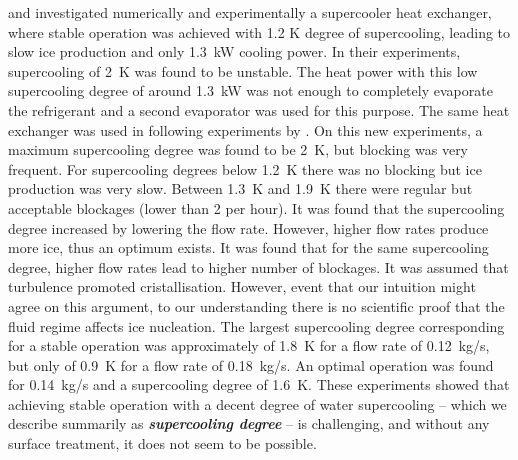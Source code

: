 \cite{castaing-lasvignottes_dynamic_2006} and \cite{bedecarrats_ice_2010} investigated numerically and experimentally a supercooler heat exchanger, where stable operation was achieved with 1.2 K degree of supercooling, leading to slow ice production and only 1.3~kW cooling power.
In their experiments, supercooling of 2~K was found to be unstable. The heat power with this low supercooling degree of around 1.3~kW was not enough to completely evaporate the refrigerant and a second evaporator was used for this purpose. %
The same heat exchanger was used in following experiments by \cite{bedecarrats_ice_2010}. On this new experiments, a maximum supercooling degree was found to be 2~K, but blocking was very frequent. For supercooling degrees below 1.2~K there was no blocking but ice production was very slow. Between 1.3~K and 1.9~K there were regular  but acceptable blockages (lower than 2 per hour).
It was found that the supercooling degree increased by lowering the flow rate. However, higher flow rates produce more ice, thus an optimum exists.
It was found that for the same supercooling degree, higher flow rates lead to higher number of blockages. It was assumed that turbulence promoted cristallisation. However, event that our intuition might agree on this argument, to our understanding there is no scientific proof that the fluid regime affects ice nucleation. 
The largest supercooling degree corresponding for a stable operation was approximately of \SI{1.8}{K} for a flow rate of \SI{0.12}{kg/s}, but only of 0.9~K for a flow rate of 0.18~kg/s. 
An optimal operation was found for 0.14~kg/s and a supercooling degree of 1.6~K. 
These experiments showed that achieving stable operation with a decent degree of water supercooling -- which we describe summarily as \textbf{\em supercooling degree} -- is challenging, and without any surface treatment, it does not seem to be possible.


